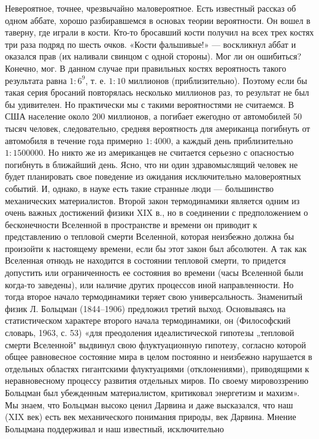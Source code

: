 Невероятное, точнее, чрезвычайно маловероятное. Есть известный рассказ об одном
аббате, хорошо разбиравшемся в основах теории вероятности. Он вошел в таверну,
где играли в кости. Кто-то бросавший кости получил на всех трех костях три раза
подряд по шесть очков. «Кости фальшивые!» --- воскликнул аббат и оказался прав
(их наливали свинцом с одной стороны). Мог ли он ошибиться? Конечно, мог. В
данном случае при правильных костях вероятность такого результата равна
$1:6^9$, т. е. $1:10$ миллионов (приблизительно). Поэтому если бы такая серия
бросаний повторялась несколько миллионов раз, то результат не был бы
удивителен. Но практически мы с такими вероятностями не считаемся. В США
население около 200 миллионов, а погибает ежегодно от автомобилей 50 тысяч
человек, следовательно, средняя вероятность для американца погибнуть от
автомобиля в течение года примерно $1:4000$, а каждый день приблизительно
$1 : 1 500 000$. Но никто же из американцев не считается серьезно с опасностью
погибнуть в ближайший день. Ясно, что ни один здравомыслящий человек не будет
планировать свое поведение из ожидания исключительно маловероятных событий. И,
однако, в науке есть такие странные люди --- большинство механических
материалистов. Второй закон термодинамики является одним из очень важных
достижений физики XIX в., но в соединении с предположением о бесконечности
Вселенной в пространстве и времени он приводит к представлению о тепловой
смерти Вселенной, которая неизбежно должна бы произойти к настоящему времени,
если бы этот закон был абсолютен. А так как Вселенная отнюдь не находится в
состоянии тепловой смерти, то придется допустить или ограниченность ее
состояния во времени (часы Вселенной были когда-то заведены), или наличие
других процессов иной направленности. Но тогда второе начало термодинамики
теряет свою универсальность. Знаменитый физик Л. Больцман (1844--1906) предложил
третий выход. Основываясь на статистическом характере второго начала
термодинамики, он (Философский словарь, 1963, с. 53) «для преодоления
идеалистической гипотезы „тепловой смерти Вселенной" выдвинул свою
флуктуационную гипотезу, согласно которой общее равновесное состояние мира в
целом постоянно и неизбежно нарушается в отдельных областях гигантскими
флуктуациями (отклонениями), приводящими к неравновесному процессу развития
отдельных миров. По своему мировоззрению Больцман был убежденным материалистом,
критиковал энергетизм и махизм». Мы знаем, что Больцман высоко ценил Дарвина и
даже высказался, что наш (XIX век) есть век механического понимания природы,
век Дарвина. Мнение Больцмана поддерживал и наш известный, исключительно
